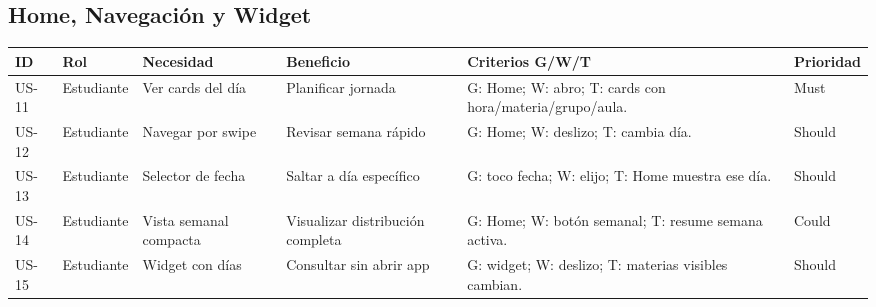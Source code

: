 \subsection{Home, Navegación y Widget}
\small
\captionsetup{type=table}
\label{tab:hu_home}
\begin{tabularx}{\linewidth}{@{}P{1.15cm}P{2.3cm}XP{2.3cm}XP{1.2cm}@{}}
\toprule
ID & Rol & Necesidad & Beneficio & Criterios G/W/T & Prioridad \\
\midrule
US-11 & Estudiante & Ver cards del día & Planificar jornada & G: Home; W: abro; T: cards con hora/materia/grupo/aula. & Must \\
US-12 & Estudiante & Navegar por swipe & Revisar semana rápido & G: Home; W: deslizo; T: cambia día. & Should \\
US-13 & Estudiante & Selector de fecha & Saltar a día específico & G: toco fecha; W: elijo; T: Home muestra ese día. & Should \\
US-14 & Estudiante & Vista semanal compacta & Visualizar distribución completa & G: Home; W: botón semanal; T: resume semana activa. & Could \\
US-15 & Estudiante & Widget con días & Consultar sin abrir app & G: widget; W: deslizo; T: materias visibles cambian. & Should \\
\bottomrule
\end{tabularx}
\normalsize

\medskip

